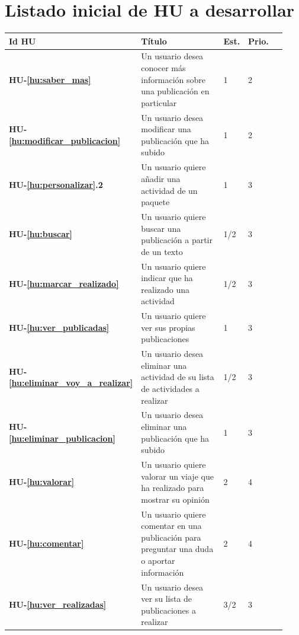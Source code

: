 \documentclass[11pt]{article}
\begin{document}
\section{Listado inicial de HU a desarrollar}
\begin{longtable}{p{0.13\linewidth}p{0.65\linewidth}p{0.05\linewidth}p{0.05\linewidth}p{0.05\linewidth}}
  \toprule
  \textbf{Id HU} & \textbf{Título} & \textbf{Est.} & \textbf{Prio.}\\
  \midrule
  \textbf{HU-\ref{hu:saber_mas}} & Un usuario desea conocer más información sobre una publicación en particular & 1 & 2 \\

  \textbf{HU-\ref{hu:modificar_publicacion}} & Un usuario desea modificar una publicación que ha subido & 1 & 2 \\	
  
  \textbf{HU-\ref{hu:personalizar}.2} & Un usuario quiere añadir una actividad de un paquete & 1 & 3 \\ 	

  \textbf{HU-\ref{hu:buscar}} & Un usuario quiere buscar una publicación a partir de un texto & 1/2 & 3 \\

  \textbf{HU-\ref{hu:marcar_realizado}} & Un usuario quiere indicar que ha realizado una actividad & 1/2 & 3 \\
  
  \textbf{HU-\ref{hu:ver_publicadas}} & Un usuario quiere ver sus propias publicaciones & 1 & 3 \\
  
  \textbf{HU-\ref{hu:eliminar_voy_a_realizar}} & Un usuario desea eliminar una actividad de su lista de actividades a realizar & 1/2 & 3 \\	
  
  \textbf{HU-\ref{hu:eliminar_publicacion}} & Un usuario desea eliminar una publicación que ha subido & 1 & 3 \\	

  \textbf{HU-\ref{hu:valorar}} & Un usuario quiere valorar un viaje que ha realizado para mostrar su opinión & 2 & 4\\

  \textbf{HU-\ref{hu:comentar}} & Un usuario quiere comentar en una publicación para preguntar una duda o aportar información & 2 & 4\\

  \textbf{HU-\ref{hu:ver_realizadas}} & Un usuario desea ver su lista de publicaciones a realizar & 3/2 & 3\\

  
  \bottomrule
\end{longtable}
\end{document}
